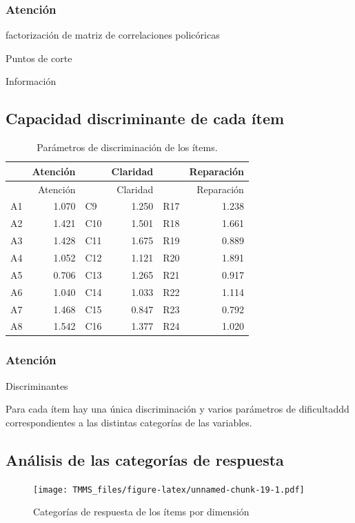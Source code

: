\documentclass[
  10pt,
  spanish,
]{article}
\begin{document}
\hypertarget{atenciuxf3n}{%
\subsubsection{Atención}\label{atenciuxf3n}}

factorización de matriz de correlaciones policóricas

Puntos de corte

Información

\hypertarget{capacidad-discriminante-de-cada-uxedtem}{%
\subsection{Capacidad discriminante de cada
ítem}\label{capacidad-discriminante-de-cada-uxedtem}}

\begin{longtable}[]{@{}lrlrlr@{}}
\caption{Parámetros de discriminación de los
ítems.\label{tab:tab_discr}}\tabularnewline
\toprule
& Atención & & Claridad & & Reparación\tabularnewline
\midrule
\endfirsthead
\toprule
& Atención & & Claridad & & Reparación\tabularnewline
\midrule
\endhead
A1 & 1.070 & C9 & 1.250 & R17 & 1.238\tabularnewline
A2 & 1.421 & C10 & 1.501 & R18 & 1.661\tabularnewline
A3 & 1.428 & C11 & 1.675 & R19 & 0.889\tabularnewline
A4 & 1.052 & C12 & 1.121 & R20 & 1.891\tabularnewline
A5 & 0.706 & C13 & 1.265 & R21 & 0.917\tabularnewline
A6 & 1.040 & C14 & 1.033 & R22 & 1.114\tabularnewline
A7 & 1.468 & C15 & 0.847 & R23 & 0.792\tabularnewline
A8 & 1.542 & C16 & 1.377 & R24 & 1.020\tabularnewline
\bottomrule
\end{longtable}

\hypertarget{atenciuxf3n-1}{%
\subsubsection{Atención}\label{atenciuxf3n-1}}

Discriminantes

Para cada ítem hay una única discriminación y varios parámetros de
dificultaddd correspondientes a las distintas categorías de las
variables.

\hypertarget{anuxe1lisis-de-las-categoruxedas-de-respuesta}{%
\subsection{Análisis de las categorías de
respuesta}\label{anuxe1lisis-de-las-categoruxedas-de-respuesta}}

\begin{figure}
\centering
\texttt{[image: TMMS\_files/figure-latex/unnamed-chunk-19-1.pdf]}
\caption{Categorías de respuesta de los ítems por dimensión}
\end{figure}
\end{document}
